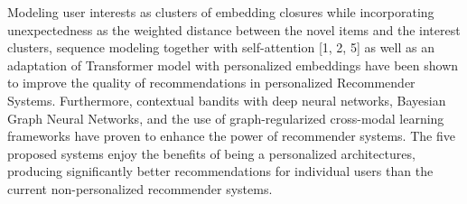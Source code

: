 Modeling user interests as clusters of embedding closures while incorporating unexpectedness as the weighted distance between the novel items and the interest clusters, sequence modeling together with self-attention [1, 2, 5] as well as an adaptation of Transformer model with personalized embeddings have been shown to improve the quality of recommendations in personalized Recommender Systems. Furthermore, contextual bandits with deep neural networks, Bayesian Graph Neural Networks, and the use of graph-regularized cross-modal learning frameworks have proven to enhance the power of recommender systems.  The five proposed systems enjoy the benefits of being a personalized architectures, producing significantly better recommendations for individual users than the
current non-personalized recommender systems. 

